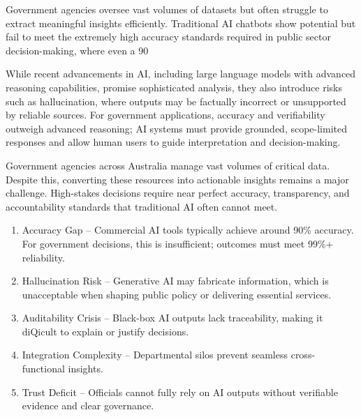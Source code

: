 
Government agencies oversee vast volumes of datasets but often struggle to extract meaningful insights efficiently. Traditional AI chatbots show potential but fail to meet the extremely high accuracy standards required in public sector decision-making, where even a 90%

While recent advancements in AI, including large language models with advanced reasoning capabilities, promise sophisticated analysis, they also introduce risks such as hallucination, where outputs may be factually incorrect or unsupported by reliable sources. For government applications, accuracy and verifiability outweigh advanced reasoning; AI systems must provide grounded, scope-limited responses and allow human users to guide interpretation and decision-making.



Government agencies across Australia manage vast volumes of critical data. Despite
this, converting these resources into actionable insights remains a major challenge.
High-stakes decisions require near perfect accuracy, transparency, and accountability
standards that traditional AI often cannot meet.


\begin{enumerate}
    \item Accuracy Gap – Commercial AI tools typically achieve around 90\% accuracy. For
    government decisions, this is insufficient; outcomes must meet 99\%+ reliability.
    \item Hallucination Risk – Generative AI may fabricate information, which is
    unacceptable when shaping public policy or delivering essential services.
    \item Auditability Crisis – Black-box AI outputs lack traceability, making it diQicult to
    explain or justify decisions.
    \item Integration Complexity – Departmental silos prevent seamless cross-functional
    insights.
    \item Trust Deficit – Officials cannot fully rely on AI outputs without verifiable
    evidence and clear governance.
\end{enumerate}

\clearpage
{}

